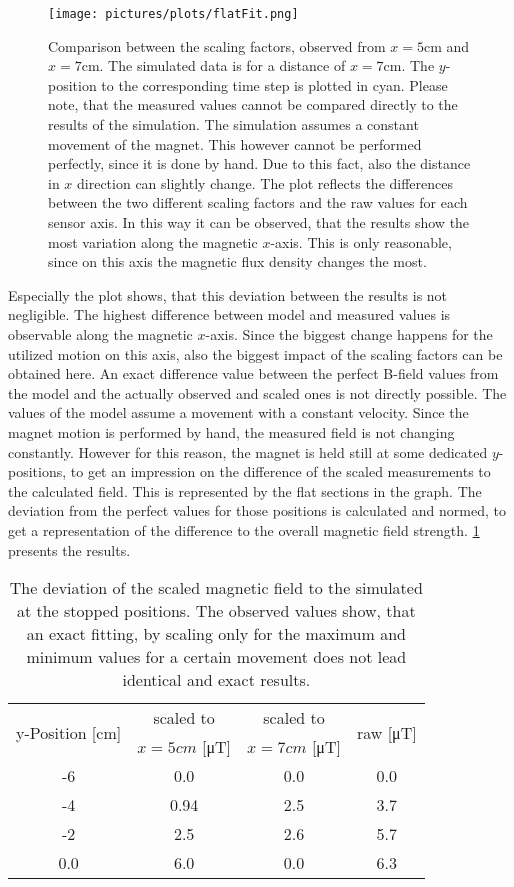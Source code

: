 \begin{figure}[!htb]
\texttt{[image: pictures/plots/flatFit.png]}
\caption{Comparison between the scaling factors, observed from $ x=5\si{\cm} $ and $ x=7\si{\cm} $. The simulated data is for a distance of $ x=7\si{\cm} $. The $ y $-position to the corresponding time step is plotted in cyan. Please note, that the measured values cannot be compared directly to the results of the simulation. The simulation assumes a constant movement of the magnet. This however cannot be performed perfectly, since it is done by hand. Due to this fact, also the distance in $ x $ direction can slightly change. The plot reflects the differences between the two different scaling factors and the raw values for each sensor axis. In this way it can be observed, that the results show the most variation along the magnetic $ x $-axis. This is only reasonable, since on this axis the magnetic flux density changes the most.}
\label{fig:flatFit}
\end{figure}
Especially the plot shows, that this deviation between the results is not negligible. The highest difference between model and measured values is observable along the magnetic $ x $-axis. Since the biggest change happens for the utilized motion on this axis, also the biggest impact of the scaling factors can be obtained here. An exact difference value between the perfect B-field values from the model and the actually observed and scaled ones is not directly possible. The values of the model assume a movement with a constant velocity. Since the magnet motion is performed by hand, the measured field is not changing constantly. However for this reason, the magnet is held still at some dedicated $ y $-positions, to get an impression on the difference of the scaled measurements to the calculated field. This is represented by the flat sections in the graph. The deviation from the perfect values for those positions is calculated and normed, to get a representation of the difference to the overall magnetic field strength. \ref{tab:diffScaled} presents the results.
\begin{table}[h!]
\centering
\begin{tabular}{c c c c}
\toprule
\multirow{2}{*}{y-Position [\si{cm}]} & scaled to  & scaled to  & \multirow{2}{*}{raw [\si{\micro \tesla}]} \\ 
 & $ x=5\si{cm} $ [\si{\micro \tesla}] & $ x=7\si{cm} $ [\si{\micro \tesla}]  & \\ \midrule
-6    & 0.0  &  0.0  & 0.0 	\\ 
-4    &	0.94 &  2.5  & 3.7 	\\ 
-2    &	2.5  &  2.6  & 5.7 	\\ 
0.0	  &	6.0  &  0.0  & 6.3 	\\ \bottomrule
\end{tabular}
\caption{The deviation of the scaled magnetic field to the simulated at the stopped positions. The observed values show, that an exact fitting, by scaling only for the maximum and minimum values for a certain movement does not lead identical and exact results.}
\label{tab:diffScaled}
\end{table}
